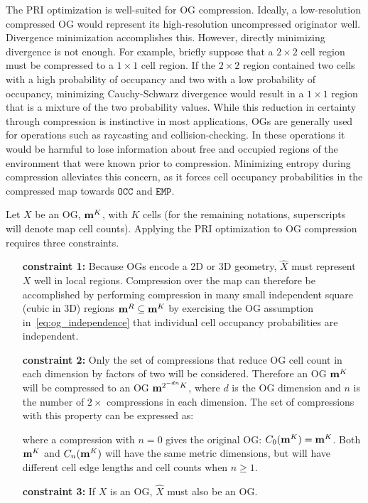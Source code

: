 The PRI optimization is well-suited for OG compression. Ideally, a
low-resolution compressed OG would represent its high-resolution uncompressed
originator well. Divergence minimization accomplishes this. However, directly minimizing
divergence is not enough. For example, briefly suppose that a $2\times2$
cell region must be compressed to a $1\times1$ cell region. If the $2\times2$
region contained two cells with a high probability of occupancy and two with a
low probability of occupancy, minimizing Cauchy-Schwarz divergence would result in
a $1\times1$ region that is a mixture of the two probability values.
While this reduction in certainty through compression is instinctive in most applications,
OGs are generally used for operations such as raycasting and collision-checking.
In these operations it would be harmful to lose information about free and occupied regions of
the environment that were known prior to compression. Minimizing entropy during
compression alleviates this concern, as it forces cell occupancy probabilities
in the compressed map towards $\texttt{OCC}$ and $\texttt{EMP}$.

Let $X$ be an OG, $\mathbf{m}^{K}$, with $K$ cells (for the remaining notations, superscripts
will denote map cell counts). Applying the PRI optimization to OG
compression requires three constraints.

\begin{enumerate}[leftmargin=3.2cm]
  \item[\bf constraint 1:]
    Because OGs encode a 2D or 3D geometry,
    $\hat{X}$ must represent $X$ well in local regions. Compression over the map can therefore
    be accomplished by performing compression in many small independent square (cubic in 3D)
    regions $\mathbf{m}^{R} \subseteq \mathbf{m}^{K}$ by exercising the
    OG assumption in~\eqref{eq:og_independence} that individual
    cell occupancy probabilities are independent.

  \item[\bf constraint 2:]
    Only the set of compressions that reduce OG cell count in each dimension
    by factors of two will be considered. Therefore an OG $\mathbf{m}^{K}$ will be
    compressed to an OG $\mathbf{m}^{2^{-dn}K}$, where
    $d$ is the OG dimension and $n$ is the number of $2\times$ compressions in each dimension. The
    set of compressions with this property can be expressed as:
%

    where a compression with $n=0$ gives the original OG:
    $C_{0}(\mathbf{m}^{K}) = \mathbf{m}^{K}$. Both $\mathbf{m}^{K}$ and $C_{n}(\mathbf{m}^{K})$ will have the same metric dimensions,
    but will have different cell edge lengths and cell counts when $n \ge 1$.
  \item[\bf constraint 3:]
    If $X$ is an OG, $\hat{X}$ must also be an OG.
\end{enumerate}


